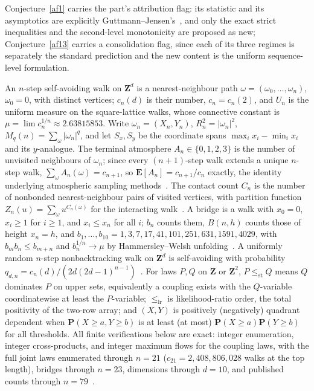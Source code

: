 \documentclass[11pt]{article}
\theoremstyle{definition}
\begin{document}
Conjecture~\ref{af1} carries the part's attribution flag: its statistic and its asymptotics are explicitly Guttmann--Jensen's~\cite{GJ22}, and only the exact strict inequalities and the second-level monotonicity are proposed as new; Conjecture~\ref{af13} carries a consolidation flag, since each of its three regimes is separately the standard prediction and the new content is the uniform sequence-level formulation.

An $n$-step self-avoiding walk on $\mathbf Z^d$ is a nearest-neighbour path $\omega=(\omega_0,\ldots,\omega_n)$, $\omega_0=0$, with distinct vertices; $c_n(d)$ is their number, $c_n=c_n(2)$, and $U_n$ is the uniform measure on the square-lattice walks, whose connective constant is $\mu=\lim c_n^{1/n}\approx2.63815853$.  Write $\omega_n=(X_n,Y_n)$, $R_n^2=|\omega_n|^2$, $M_q(n)=\sum_\omega|\omega_n|^q$, and let $S_x,S_y$ be the coordinate spans $\max_i x_i-\min_i x_i$ and its $y$-analogue.  The terminal atmosphere $A_n\in\{0,1,2,3\}$ is the number of unvisited neighbours of $\omega_n$; since every $(n+1)$-step walk extends a unique $n$-step walk, $\sum_\omega A_n(\omega)=c_{n+1}$, so $\mathbf E[A_n]=c_{n+1}/c_n$ exactly, the identity underlying atmospheric sampling methods~\cite{RJvR08,OP08}.  The contact count $C_n$ is the number of nonbonded nearest-neighbour pairs of visited vertices, with partition function $Z_n(u)=\sum_\omega u^{C_n(\omega)}$ for the interacting walk~\cite{BOS01,BGJ20}.  A bridge is a walk with $x_0=0$, $x_i\ge1$ for $i\ge1$, and $x_i\le x_n$ for all $i$; $b_n$ counts them, $B(n,h)$ counts those of height $x_n=h$, and $b_1,\ldots,b_{10}=1,3,7,17,41,101,251,631,1591,4029$, with $b_mb_n\le b_{m+n}$ and $b_n^{1/n}\to\mu$ by Hammersley--Welsh unfolding~\cite{HW62}.  A uniformly random $n$-step nonbacktracking walk on $\mathbf Z^d$ is self-avoiding with probability $q_{d,n}=c_n(d)/(2d(2d-1)^{n-1})$~\cite{FvdH13}.  For laws $P,Q$ on $\mathbf Z$ or $\mathbf Z^2$, $P\le_{\mathrm{st}}Q$ means $Q$ dominates $P$ on upper sets, equivalently a coupling exists with the $Q$-variable coordinatewise at least the $P$-variable; $\le_{\mathrm{lr}}$ is likelihood-ratio order, the total positivity of the two-row array; and $(X,Y)$ is positively (negatively) quadrant dependent when $\mathbf P(X\ge a,Y\ge b)$ is at least (at most) $\mathbf P(X\ge a)\mathbf P(Y\ge b)$ for all thresholds.  All finite verifications below are exact: integer enumeration, integer cross-products, and integer maximum flows for the coupling laws, with the full joint laws enumerated through $n=21$ ($c_{21}=2{,}408{,}806{,}028$ walks at the top length), bridges through $n=23$, dimensions through $d=10$, and published counts through $n=79$~\cite{Jen13}.
\end{document}
